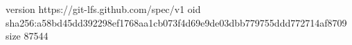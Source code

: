 version https://git-lfs.github.com/spec/v1
oid sha256:a58bd45dd392298ef1768aa1cb073f4d69e9de03dbb779755ddd772714af8709
size 87544

